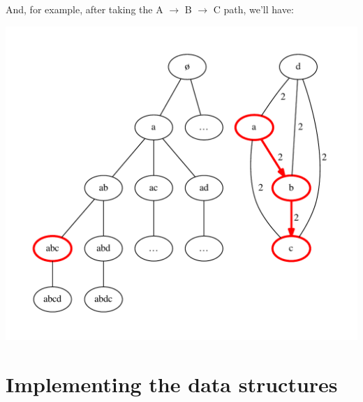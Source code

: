 \documentclass[french]{article}
\begin{document}
And, for example, after taking the A $\rightarrow$ B $\rightarrow$ C path, we'll have:
\begin{center}
\includegraphics[scale=0.5]{graphs/modeling-the-problem_example2.pdf}
\end{center}

\part{Implementing the data structures}

\printbibliography%
\end{document}
